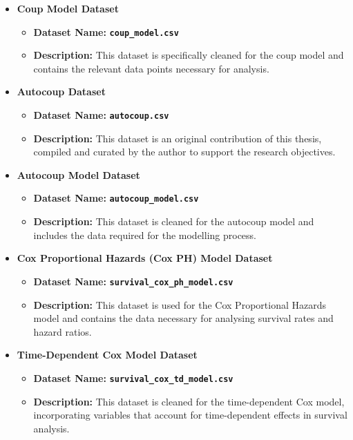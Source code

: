 \documentclass[
  12pt,
]{report}
\begin{document}
\begin{itemize}
\item
  \textbf{Coup Model Dataset}

  \begin{itemize}
  \item
    \textbf{Dataset Name:} \textbf{\texttt{coup\_model.csv}}
  \item
    \textbf{Description:} This dataset is specifically cleaned for the
    coup model and contains the relevant data points necessary for
    analysis.
  \end{itemize}
\item
  \textbf{Autocoup Dataset}

  \begin{itemize}
  \item
    \textbf{Dataset Name:} \textbf{\texttt{autocoup.csv}}
  \item
    \textbf{Description:} This dataset is an original contribution of
    this thesis, compiled and curated by the author to support the
    research objectives.
  \end{itemize}
\item
  \textbf{Autocoup Model Dataset}

  \begin{itemize}
  \item
    \textbf{Dataset Name:} \textbf{\texttt{autocoup\_model.csv}}
  \item
    \textbf{Description:} This dataset is cleaned for the autocoup model
    and includes the data required for the modelling process.
  \end{itemize}
\item
  \textbf{Cox Proportional Hazards (Cox PH) Model Dataset}

  \begin{itemize}
  \item
    \textbf{Dataset Name:}
    \textbf{\texttt{survival\_cox\_ph\_model.csv}}
  \item
    \textbf{Description:} This dataset is used for the Cox Proportional
    Hazards model and contains the data necessary for analysing survival
    rates and hazard ratios.
  \end{itemize}
\item
  \textbf{Time-Dependent Cox Model Dataset}

  \begin{itemize}
  \item
    \textbf{Dataset Name:}
    \textbf{\texttt{survival\_cox\_td\_model.csv}}
  \item
    \textbf{Description:} This dataset is cleaned for the time-dependent
    Cox model, incorporating variables that account for time-dependent
    effects in survival analysis.
  \end{itemize}
\end{itemize}
\end{document}
